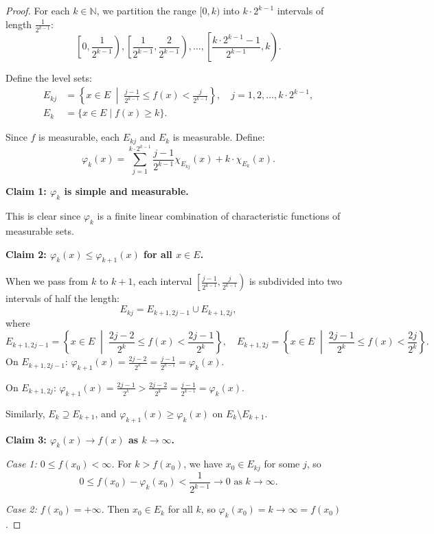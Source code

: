\documentclass[11pt]{report}
\begin{document}
\begin{proof}
For each $k \in \mathbb{N}$, we partition the range $[0, k)$ into $k \cdot 2^{k-1}$ intervals of length $\frac{1}{2^{k-1}}$:
\[
\left[0, \frac{1}{2^{k-1}}\right), \left[\frac{1}{2^{k-1}}, \frac{2}{2^{k-1}}\right), \ldots, \left[\frac{k \cdot 2^{k-1} - 1}{2^{k-1}}, k\right).
\]

Define the level sets:
\begin{align*}
E_{kj} &= \left\{x \in E \;\middle|\; \frac{j-1}{2^{k-1}} \leq f(x) < \frac{j}{2^{k-1}}\right\}, \quad j = 1, 2, \ldots, k \cdot 2^{k-1}, \\
E_k &= \{x \in E \mid f(x) \geq k\}.
\end{align*}

Since $f$ is measurable, each $E_{kj}$ and $E_k$ is measurable. Define:
\[
\varphi_k(x) = \sum_{j=1}^{k \cdot 2^{k-1}} \frac{j-1}{2^{k-1}} \chi_{E_{kj}}(x) + k \cdot \chi_{E_k}(x).
\]

\textbf{Claim 1: $\varphi_k$ is simple and measurable.}

This is clear since $\varphi_k$ is a finite linear combination of characteristic functions of measurable sets.

\textbf{Claim 2: $\varphi_k(x) \leq \varphi_{k+1}(x)$ for all $x \in E$.}

When we pass from $k$ to $k+1$, each interval $\left[\frac{j-1}{2^{k-1}}, \frac{j}{2^{k-1}}\right)$ is subdivided into two intervals of half the length:
\[
E_{kj} = E_{k+1, 2j-1} \cup E_{k+1, 2j},
\]
where
\[
E_{k+1, 2j-1} = \left\{x \in E \;\middle|\; \frac{2j-2}{2^k} \leq f(x) < \frac{2j-1}{2^k}\right\}, \quad E_{k+1, 2j} = \left\{x \in E \;\middle|\; \frac{2j-1}{2^k} \leq f(x) < \frac{2j}{2^k}\right\}.
\]
On $E_{k+1, 2j-1}$: $\varphi_{k+1}(x) = \frac{2j-2}{2^k} = \frac{j-1}{2^{k-1}} = \varphi_k(x)$.

On $E_{k+1, 2j}$: $\varphi_{k+1}(x) = \frac{2j-1}{2^k} > \frac{2j-2}{2^k} = \frac{j-1}{2^{k-1}} = \varphi_k(x)$.

Similarly, $E_k \supseteq E_{k+1}$, and $\varphi_{k+1}(x) \geq \varphi_k(x)$ on $E_k \setminus E_{k+1}$.

\textbf{Claim 3: $\varphi_k(x) \to f(x)$ as $k \to \infty$.}

\textit{Case 1: $0 \leq f(x_0) < \infty$.} For $k > f(x_0)$, we have $x_0 \in E_{kj}$ for some $j$, so
\[
0 \leq f(x_0) - \varphi_k(x_0) < \frac{1}{2^{k-1}} \to 0 \text{ as } k \to \infty.
\]

\textit{Case 2: $f(x_0) = +\infty$.} Then $x_0 \in E_k$ for all $k$, so $\varphi_k(x_0) = k \to \infty = f(x_0)$.
\end{proof}
\end{document}
